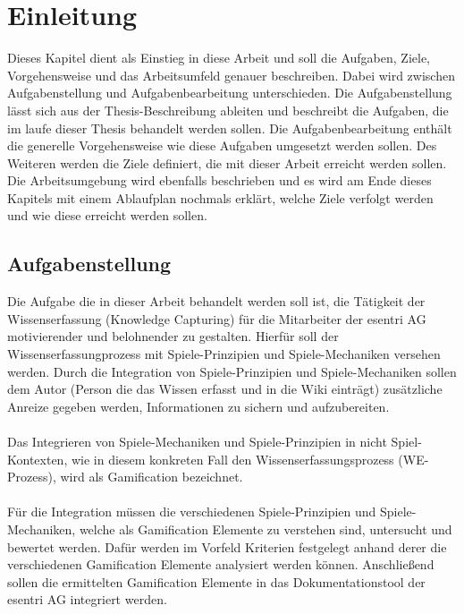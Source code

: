 \documentclass[a4paper,12pt,twoside]{scrartcl}
\begin{document}
\cleardoublepage

\section{Einleitung}
Dieses Kapitel dient als Einstieg in diese Arbeit und soll die Aufgaben, Ziele, Vorgehensweise und das Arbeitsumfeld genauer beschreiben. Dabei wird zwischen Aufgabenstellung und Aufgabenbearbeitung unterschieden. Die Aufgabenstellung lässt sich aus der Thesis-Beschreibung ableiten und beschreibt die Aufgaben, die im laufe dieser Thesis behandelt werden sollen. Die Aufgabenbearbeitung enthält die generelle Vorgehensweise wie diese Aufgaben umgesetzt werden sollen. Des Weiteren werden die Ziele definiert, die mit dieser Arbeit erreicht werden sollen. Die Arbeitsumgebung wird ebenfalls beschrieben und es wird am Ende dieses Kapitels mit einem Ablaufplan nochmals erklärt, welche Ziele verfolgt werden und wie diese erreicht werden sollen.
\subsection{Aufgabenstellung}
Die Aufgabe die in dieser Arbeit behandelt werden soll ist, die Tätigkeit der Wissenserfassung (Knowledge Capturing) für die Mitarbeiter der esentri AG motivierender und belohnender zu gestalten. Hierfür soll der Wissenserfassungprozess mit Spiele-Prinzipien und Spiele-Mechaniken versehen werden. Durch die Integration von Spiele-Prinzipien und Spiele-Mechaniken sollen dem Autor (Person die das Wissen erfasst und in die Wiki einträgt) zusätzliche Anreize gegeben werden, Informationen zu sichern und aufzubereiten. 
\\\\
Das Integrieren von Spiele-Mechaniken und Spiele-Prinzipien in nicht Spiel-Kontexten, wie in diesem konkreten Fall den Wissenserfassungsprozess (WE-Prozess), wird als Gamification bezeichnet.
\\\\
Für die Integration müssen die verschiedenen Spiele-Prinzipien und Spiele-Mechaniken, welche als Gamification Elemente zu verstehen sind, untersucht und bewertet werden. Dafür werden im Vorfeld Kriterien festgelegt anhand derer die verschiedenen Gamification Elemente analysiert werden können. Anschließend sollen die ermittelten Gamification Elemente in das Dokumentationstool der esentri AG integriert werden. 
\end{document}
